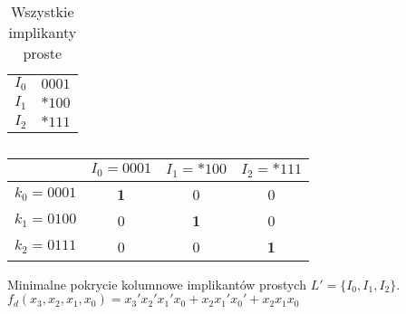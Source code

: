 \begin{table}[H]
    \centering
    \begin{tabular}[t]{ |c|c| }
        \hline
        $I_0$ & $0001$ \\
        $I_1$ & ${*}100$ \\
        $I_2$ & ${*}111$ \\
        \hline
    \end{tabular}
    \caption{Wszystkie implikanty proste} \label{tab:all-implicantsd}
\end{table}

\begin{table}[H]
    \centering
    \begin{tabular}[t]{ |c||c|c|c| }
        \hline
        & $I_0 = 0001$ & $I_1 = {*}100$ & $I_2 = {*}111$ \\
        \hline
        \hline
        $k_0 = 0001$ & \textbf{1} & 0 & 0 \\
        \hline
        $k_1 = 0100$ & 0 & \textbf{1} &  0 \\
        \hline
        $k_2 = 0111$ & 0 & 0 & \textbf{1} \\
        \hline
    \end{tabular}
    \caption{} \label{tab:min-blockd}
\end{table}
Minimalne pokrycie kolumnowe implikantów prostych $L' = \{I_0, I_1, I_2\}$.
$f_d(x_3, x_2, x_1, x_0) = x_3'x_2'x_1'x_0 + x_{2}x_1'x_0' + x_{2}x_{1}x_{0}$